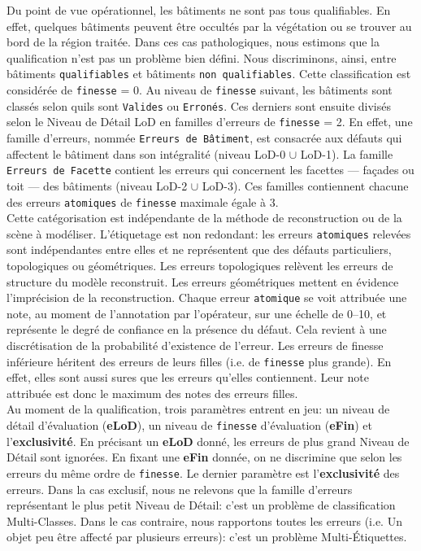         Du point de vue opérationnel, les bâtiments ne sont pas tous qualifiables.
        En effet, quelques bâtiments peuvent être occultés par la végétation ou se trouver au bord de la région traitée.
        Dans ces cas pathologiques, nous estimons que la qualification n'est pas un problème bien défini.
        Nous discriminons, ainsi, entre bâtiments \texttt{qualifiables} et bâtiments \texttt{non qualifiables}.
        Cette classification est considérée de \texttt{finesse} = 0.
        Au niveau de \texttt{finesse} suivant, les bâtiments sont classés selon quils sont \texttt{Valides} ou \texttt{Erronés}.
        Ces derniers sont ensuite divisés selon le Niveau de Détail LoD en familles d'erreurs de \texttt{finesse} = 2.
        En effet, une famille d'erreurs, nommée \texttt{Erreurs de Bâtiment}, est consacrée aux défauts qui affectent le bâtiment dans son intégralité (niveau LoD-0 \(\cup\) LoD-1).
        La famille \texttt{Erreurs de Facette} contient les erreurs qui concernent les facettes --- façades ou toit --- des bâtiments (niveau LoD-2 \(\cup\) LoD-3).
        Ces familles contiennent chacune des erreurs \texttt{atomiques} de \texttt{finesse} maximale égale à $3$.\\

        Cette catégorisation est indépendante de la méthode de reconstruction ou de la scène à modéliser.
        L'étiquetage est non redondant: les erreurs \texttt{atomiques} relevées sont indépendantes entre elles et ne représentent que des défauts particuliers, topologiques ou géométriques.
        Les erreurs topologiques relèvent les erreurs de structure du modèle reconstruit.
        Les erreurs géométriques mettent en évidence l'imprécision de la reconstruction.
        Chaque erreur \texttt{atomique} se voit attribuée une note, au moment de l'annotation par l'opérateur, sur une échelle de \numrange[locale=FR]{0}{10}, et représente le degré de confiance en la présence du défaut.
        Cela revient à une discrétisation de la probabilité d'existence de l'erreur.
        Les erreurs de finesse inférieure héritent des erreurs de leurs filles (i.e. de \texttt{finesse} plus grande).
        En effet, elles sont aussi sures que les erreurs qu'elles contiennent.
        Leur note attribuée est donc le maximum des notes des erreurs filles.\\

        Au moment de la qualification, trois paramètres entrent en jeu: un niveau de détail d'évaluation (\textbf{eLoD}), un niveau de \texttt{finesse} d'évaluation (\textbf{eFin}) et l'\textbf{exclusivité}.
        En précisant un \textbf{eLoD} donné, les erreurs de plus grand Niveau de Détail sont ignorées.
        En fixant une \textbf{eFin} donnée, on ne discrimine que selon les erreurs du même ordre de \texttt{finesse}.
        Le dernier paramètre est l'\textbf{exclusivité} des erreurs.
        Dans la cas exclusif, nous ne relevons que la famille d'erreurs représentant le plus petit Niveau de Détail: c'est un problème de classification Multi-Classes.
        Dans le cas contraire, nous rapportons toutes les erreurs (i.e. Un objet peu être affecté par plusieurs erreurs): c'est un problème Multi-\'Etiquettes.\\

